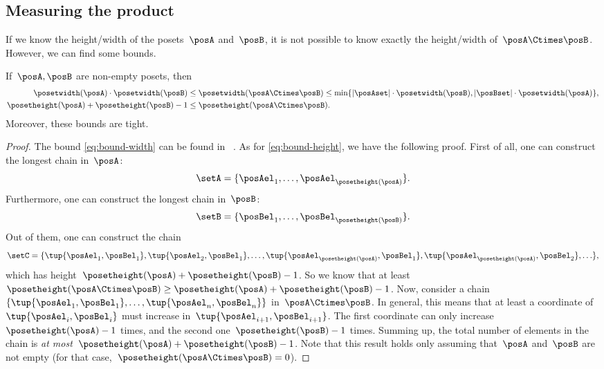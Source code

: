 \subsection{Measuring the product}
If we know the height/width of the posets~$\posA$ and~$\posB$, it is not possible to know exactly the height/width of~$\posA\Ctimes\posB$.
However, we can find some bounds.
\begin{widepar}
    \begin{lemma}
        \label{lem:measuring-product}
        If~$\posA,\posB$ are non-empty posets, then
        \begin{align}
            \posetwidth(\posA) \cdot \posetwidth(\posB)
             & \leq \posetwidth(\posA\Ctimes \posB)
            \leq \min \{
            \vert \posAset \vert \cdot \posetwidth(\posB),\vert \posBset \vert \cdot \posetwidth(\posA)
            \}, \label{eq:bound-width} \\
            \posetheight(\posA)+\posetheight(\posB)-1
             & \leq
            \posetheight(\posA\Ctimes \posB).
            \label{eq:bound-height}
        \end{align}
        Moreover, these bounds are tight.
    \end{lemma}
\end{widepar}

\begin{proof}
    The bound \cref{eq:bound-width} can be found in ~\cite{bezrukovantichains}.
    As for \cref{eq:bound-height}, we have the following proof.
    First of all, one can construct the longest chain in~$\posA$:
    \begin{equation*}
        \setA=\{\posAel_1,\ldots, \posAel_{\posetheight(\posA)}\}.
    \end{equation*}
    Furthermore, one can construct the longest chain in~$\posB$:
    \begin{equation*}
        \setB=\{\posBel_1,\ldots, \posBel_{\posetheight(\posB)}\}.
    \end{equation*}
    Out of them, one can construct the chain
    \begin{equation*}
        \setC=\{ \tup{\posAel_1,\posBel_1},\tup{\posAel_2,\posBel_1},\ldots, \tup{\posAel_{\posetheight(\posA)}, \posBel_1}, \tup{\posAel_{\posetheight(\posA)}, \posBel_2},\ldots\},
    \end{equation*}
    which has height~$\posetheight(\posA)+\posetheight(\posB)-1$.
    So we know that at least~$\posetheight(\posA\Ctimes \posB)\geq \posetheight(\posA)+\posetheight(\posB)-1$.
    Now, consider a chain~$\{\tup{\posAel_1,\posBel_1},\ldots, \tup{\posAel_n,\posBel_n}\}$ in~$\posA\Ctimes \posB$.
    In general, this means that at least a coordinate of~$\tup{\posAel_{i},\posBel_{i}}$ must increase in~$\tup{\posAel_{i+1},\posBel_{i+1}}$.
    The first coordinate can only increase~$\posetheight(\posA)-1$ times, and the second one~$\posetheight(\posB)-1$ times.
    Summing up, the total number of elements in the chain is \emph{at most}~$\posetheight(\posA)+\posetheight(\posB)-1$.
    Note that this result holds only assuming that~$\posA$ and~$\posB$ are not empty (for that case,~$\posetheight(\posA\Ctimes \posB)=0$).
\end{proof}
